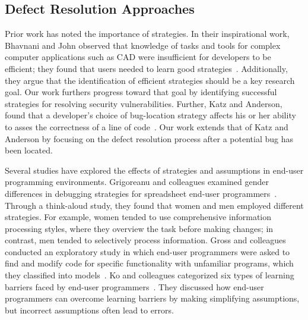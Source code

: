 \documentclass[10pt,journal,compsoc]{IEEEtran}
\begin{document}
\subsection{Defect Resolution Approaches}
\label{strategies}
Prior work has noted the importance of strategies.
In their inspirational work, Bhavnani and John observed that knowledge of tasks and tools for complex computer applications such as CAD were insufficient for developers to be efficient; they found that users needed to learn good strategies~\cite{Bhavnani2000}. 
Additionally, they argue that the identification of efficient strategies should be a key research goal. 
Our work furthers progress toward that goal by identifying successful strategies for resolving security vulnerabilities.
Further, Katz and Anderson, found that a developer's choice of bug-location strategy affects his or her ability to asses the correctness of a line of code~\cite{Katz:1987}.
Our work extends that of Katz and Anderson by focusing on the defect resolution process after a potential bug has been located.


Several studies have explored the effects of strategies and assumptions in end-user programming environments.
Grigoreanu and colleagues examined gender differences in debugging strategies for spreadsheet end-user programmers~\cite{Grigoreanu:2012:sense, Grigoreanu:2009}. 
Through a think-aloud study, they found that women and men employed different strategies. 
For example, women tended to use comprehensive information processing styles, where they overview the task before making changes; in contrast, men tended to selectively process information.
Gross and colleagues conducted an exploratory study in which end-user programmers were asked to find and modify code for specific functionality with unfamiliar programs, which they classified into models~\cite{Gross:2010}.
Ko and colleagues categorized six types of learning barriers faced by end-user programmers~\cite{Ko:2004:barriers}.
They discussed how end-user programmers can overcome learning barriers by making simplifying assumptions, but incorrect assumptions often lead to errors.


\end{document}

